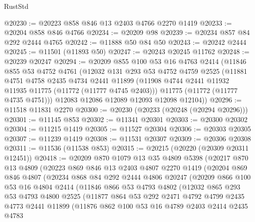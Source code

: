 \begin{lexlean}{RustStd}
\begin{coremodule}
@20230 := @20223 @858 @846 @13 @2403 @4766 @2270 @1419
@20233 := @20204 @858 @846 @4766
@20234 := @20209 @98
@20239 := @20234 @857 @84 @292 @2444 @4765
@20242 := @11888 @50 @84 @50
@20243 := @20242 @2444
@20245 := @11501 (@11893 @50)
@20247 := @20243 @20245 @11762
@20248 := @20239 @20247
@20294 := @20209
    @855
    @100
    @53
    @16
    @4763
    @2414
    (@11846
      @855
      @53
      @4752
      @4761
      (@12032
        @131
        @293
        @53
        @4752
        @4759
        @2525
        (@11881
          @4751
          @4758
          @2435
          @4734
          @2441
          @11899
          (@11908 @4744 @2441 @11932 @11935 @11775 (@11772 (@11777 @4745 @2403)))
          @11775
          (@11772 (@11777 @4735 @4751)))
        @12083
        @12086
        @12089
        @12093
        @12098
        @12104))
@20296 := @11518 @11831 @2270
@20300 := @20230 (@20233 (@20248 (@20294 @20296)))
@20301 := @11145 @853
@20302 := @11341 @20301
@20303 := @20300 @20302
@20304 := @11215 @1419
@20305 := @11527 @20304
@20306 := @20303 @20305
@20307 := @11239 @1419
@20308 := @11531 @20307
@20309 := @20306 @20308
@20311 := @11536 (@11538 @853)
@20315 := @20215 (@20220 (@20309 @20311 @12451))
@20418 := @20209
    @870
    @1079
    @13
    @35
    @4809
    @5398
    (@20217
      @870
      @13
      @4809
      (@20223
        @869
        @846
        @13
        @2403
        @4807
        @2270
        @1419
        (@20204
          @869
          @846
          @4807
          (@20234
            @868
            @84
            @292
            @2444
            @4806
            @20247
            (@20209
              @866
              @100
              @53
              @16
              @4804
              @2414
              (@11846
                @866
                @53
                @4793
                @4802
                (@12032
                  @865
                  @293
                  @53
                  @4793
                  @4800
                  @2525
                  (@11877
                    @864
                    @53
                    @292
                    @2471
                    @4792
                    @4799
                    @2435
                    @4773
                    @2441
                    @11899
                    (@11876
                      @862
                      @100
                      @53
                      @16
                      @4789
                      @2403
                      @2414
                      @2435
                      @4783

\end{coremodule}
\end{lexlean}
